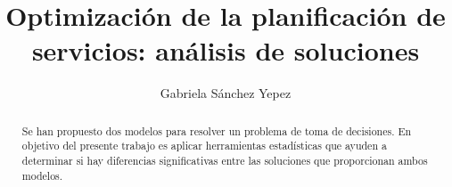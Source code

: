 \documentclass[preprint,12pt,authoryear]{elsarticle}
\begin{document}
	
\begin{frontmatter}



\title{Optimización de la planificación de servicios: análisis de soluciones}
\date{}


\author{Gabriela S\'anchez Yepez}


\begin{abstract}
Se han propuesto dos modelos para resolver un problema de toma de decisiones. En objetivo del presente trabajo es aplicar herramientas estadísticas que ayuden a determinar si hay diferencias significativas entre las soluciones que proporcionan ambos modelos. 
\end{abstract}



\end{frontmatter}
\end{document}
